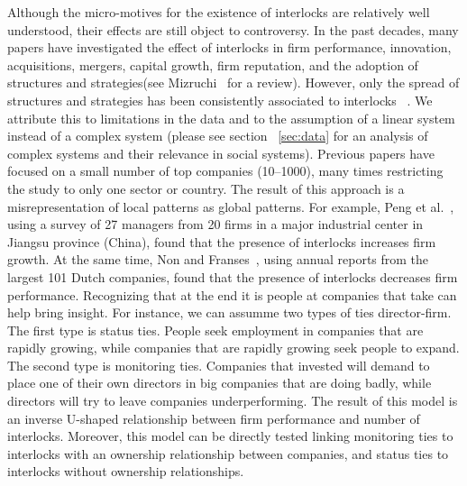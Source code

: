 Although the micro-motives for the existence of interlocks are relatively well understood, 
their effects are still object to controversy. 
In the past decades, many papers have investigated the effect of interlocks in firm performance, innovation, acquisitions, mergers, capital growth, firm reputation, and the adoption of structures and strategies(see Mizruchi~\cite{Mizruchi1996} for a review).
However, only the spread of structures and strategies has been consistently associated to interlocks~\citep{Haunschild1993,Davis1997,Davis1991,Rao1999,Shropshire2010} .
We attribute this to limitations in the data and to the assumption of a linear system instead of a complex system (please see section ~\ref{sec:data} for an analysis of complex systems and their relevance in social systems).
Previous papers have focused on a small number of top companies (10--1000), 
many times restricting the study to only one sector or country. 
The result of this approach is a misrepresentation of local patterns as global patterns.
For example, 
Peng et al.~\citep{Peng2016}, using a survey of 27 managers from 20 firms in a major industrial center in Jiangsu province (China), found that the presence of interlocks increases firm growth.
At the same time,
Non and Franses~\citep{franses2007interlocking}, using annual reports from the largest 101 Dutch companies, found that the presence of interlocks decreases firm performance.
Recognizing that at the end it is people at companies that take can help bring insight.
For instance, we can assumme two types of ties director-firm. 
The first type is status ties.
People seek employment in companies that are rapidly growing,
while companies that are rapidly growing seek people to expand.
The second type is monitoring ties.
Companies that invested will demand to place one of their own directors in big companies that are doing badly,
while directors will try to leave companies underperforming.
The result of this model is an inverse U-shaped relationship between firm performance and number of interlocks.
Moreover, this model can be directly tested linking monitoring ties to interlocks with an ownership relationship between companies, 
and status ties to interlocks without ownership relationships.




